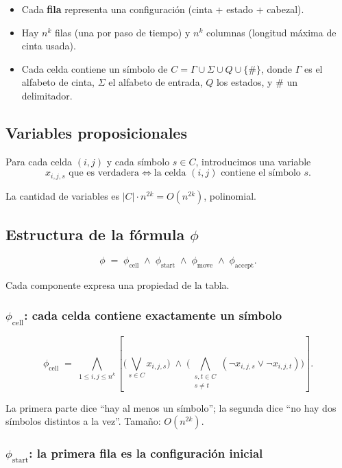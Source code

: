 \documentclass[11pt,a4paper]{article}
\theoremstyle{definicion}
\begin{document}
\begin{itemize}
    \item Cada \textbf{fila} representa una configuración (cinta + estado + cabezal).
    \item Hay $n^k$ filas (una por paso de tiempo) y $n^k$ columnas (longitud máxima de cinta usada).
    \item Cada celda contiene un símbolo de $C = \Gamma \cup \Sigma \cup Q \cup \{\#\}$, donde $\Gamma$ es el alfabeto de cinta, $\Sigma$ el alfabeto de entrada, $Q$ los estados, y $\#$ un delimitador.
\end{itemize}

\subsection{Variables proposicionales}

Para cada celda $(i, j)$ y cada símbolo $s \in C$, introducimos una variable
\[
x_{i,j,s} \text{ que es verdadera} \iff \text{la celda } (i, j) \text{ contiene el símbolo } s.
\]

La cantidad de variables es $|C| \cdot n^{2k} = O(n^{2k})$, polinomial.

\subsection{Estructura de la fórmula $\phi$}

\[
\phi \;=\; \phi_{\text{cell}} \;\land\; \phi_{\text{start}} \;\land\; \phi_{\text{move}} \;\land\; \phi_{\text{accept}}.
\]

Cada componente expresa una propiedad de la tabla.

\subsubsection*{$\phi_{\text{cell}}$: cada celda contiene exactamente un símbolo}

\[
\phi_{\text{cell}} \;=\; \bigwedge_{1 \leq i, j \leq n^k} \left[ \Big(\bigvee_{s \in C} x_{i,j,s}\Big) \;\land\; \Big( \bigwedge_{\substack{s, t \in C \\ s \neq t}} (\neg x_{i,j,s} \lor \neg x_{i,j,t}) \Big) \right].
\]

La primera parte dice ``hay al menos un símbolo''; la segunda dice ``no hay dos símbolos distintos a la vez''. Tamaño: $O(n^{2k})$.

\subsubsection*{$\phi_{\text{start}}$: la primera fila es la configuración inicial}
\end{document}
